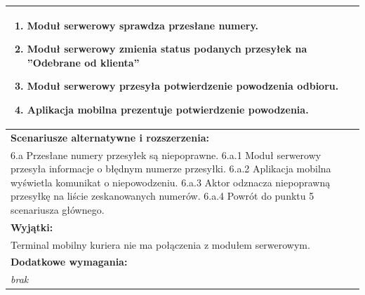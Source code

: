 \begin{center}
\begin{longtable}[h]{|p{1.6cm}|p{13.5cm}|}
{\begin{enumerate}
\item Moduł serwerowy sprawdza przesłane numery.
\item Moduł serwerowy zmienia status podanych przesyłek na ''Odebrane od klienta''
\item Moduł serwerowy przesyła potwierdzenie powodzenia odbioru.
\item Aplikacja mobilna prezentuje potwierdzenie powodzenia.
\end{enumerate}
} \\ \hline
\multicolumn{2}{|p{15.1cm}|}{\textbf{Scenariusze alternatywne i rozszerzenia:}} \\
\multicolumn{2}{|p{15.1cm}|}{
6.a Przesłane numery przesyłek są niepoprawne. \newline
6.a.1 Moduł serwerowy przesyła informacje o błędnym numerze przesyłki. \newline
6.a.2 Aplikacja mobilna wyświetla komunikat o niepowodzeniu. \newline
6.a.3 Aktor odznacza niepoprawną przesyłkę na liście zeskanowanych numerów. \newline
6.a.4 Powrót do punktu 5 scenariusza głównego.
} \\ \hline
\multicolumn{2}{|p{15.1cm}|}{\textbf{Wyjątki:}} \\
\multicolumn{2}{|p{15.1cm}|}{
Terminal mobilny kuriera nie ma połączenia z modułem serwerowym.
} \\ \hline
\multicolumn{2}{|p{15.1cm}|}{\textbf{Dodatkowe wymagania:}} \\
\multicolumn{2}{|p{15.1cm}|}{
\textit{brak}
} \\
\hline
\end{longtable}
\end{center}

